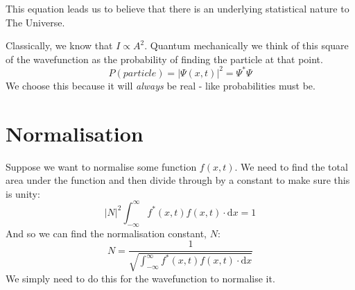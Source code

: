 This equation leads us to believe that there is an underlying statistical
nature to The Universe.

Classically, we know that $I \propto A^2$. Quantum mechanically we think of this
square of the wavefunction as the probability of finding the particle at that
point.
$$
	P(particle) = |\Psi(x,t)|^2 = \Psi^*\Psi
$$
We choose this because it will \emph{always} be real - like probabilities must
be.

\section{Normalisation}

Suppose we want to normalise some function $f(x,t)$. We need to find the total
area under the function and then divide through by a constant to make sure this
is unity:
$$
	|N|^2\int^\infty_{-\infty}f^*(x,t)f(x,t)\cdot\mathrm{d}x = 1
$$
And so we can find the normalisation constant, $N$:
$$
	N = \frac{1}{\sqrt{\int^\infty_{-\infty}f^*(x,t)f(x,t)\cdot\mathrm{d}x}}
$$
We simply need to do this for the wavefunction to normalise it.

